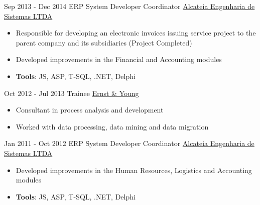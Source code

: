 \documentclass[letterpaper]{twentysecondcv} %
\begin{document}
        

\begin{twenty} %
\twentyitem
    	{Sep 2013 -}
		{Dec 2014}
        {ERP System Developer Coordinator}
        {\href{}{Alcateia Engenharia de Sistemas LTDA}}
        {}
        {\begin{itemize}
        \item Responsible for developing an electronic invoices issuing service project to the parent company and its subsidiaries (Project Completed)
        \item Developed improvements in the Financial and Accounting modules
        \item \textbf{Tools}: JS, ASP, T-SQL, .NET, Delphi \vspace{2mm}
        \end{itemize}}
        
\end{twenty}


\begin{twenty} %
\twentyitem
    	{Oct 2012 -}
		{Jul 2013}
        {Trainee}
        {\href{}{Ernst \& Young}}
        {}
        {\begin{itemize}
        \item Consultant in process analysis and development
        \item Worked with data processing, data mining and data migration
        \end{itemize}}
        
\end{twenty}

\begin{twenty} %
\twentyitem
    	{Jan 2011 -}
		{Oct 2012}
        {ERP System Developer Coordinator}
        {\href{}{Alcateia Engenharia de Sistemas LTDA}}
        {}
        {\begin{itemize}
        \item Developed improvements in the Human Resources, Logistics and Accounting modules
        \item \textbf{Tools}: JS, ASP, T-SQL, .NET, Delphi \vspace{2mm}
        \end{itemize}}
        
\end{twenty}

\end{document}
